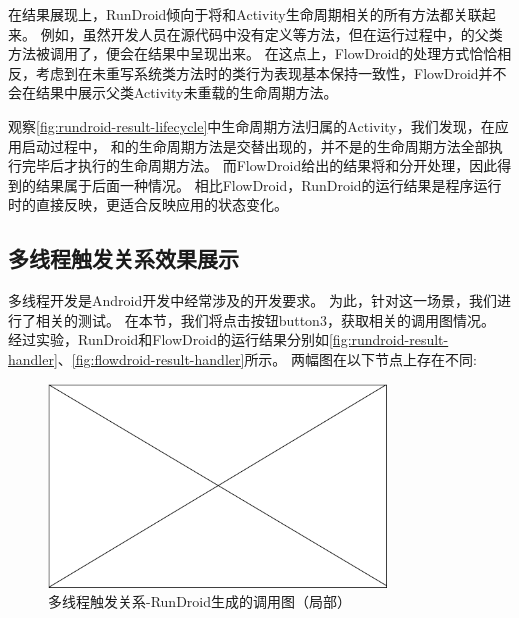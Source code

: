 在结果展现上，RunDroid倾向于将和Activity生命周期相关的所有方法都关联起来。
例如，虽然开发人员在源代码中没有定义等方法，但在运行过程中，的父类方法被调用了，便会在结果中呈现出来。
在这点上，FlowDroid的处理方式恰恰相反，考虑到在未重写系统类方法时的类行为表现基本保持一致性，FlowDroid并不会在结果中展示父类Activity未重载的生命周期方法。


{观察\autoref{fig:rundroid-result-lifecycle}中生命周期方法归属的Activity，我们发现，在应用启动过程中，
和的生命周期方法是交替出现的，并不是的生命周期方法全部执行完毕后才执行的生命周期方法。
而FlowDroid给出的结果将和分开处理，因此得到的结果属于后面一种情况。
相比FlowDroid，RunDroid的运行结果是程序运行时的直接反映，更适合反映应用的状态变化。
}

\subsection{多线程触发关系效果展示}

多线程开发是Android开发中经常涉及的开发要求。
为此，针对这一场景，我们进行了相关的测试。
在本节，我们将点击按钮button3，获取相关的调用图情况。
经过实验，RunDroid和FlowDroid的运行结果分别如\autoref{fig:rundroid-result-handler}、\autoref{fig:flowdroid-result-handler}所示。
两幅图在以下节点上存在不同:





\begin{figure}[ht]
	\centering
	\includegraphics[width=0.8\textwidth]{./Figures/empty.png}
	\caption{多线程触发关系-RunDroid生成的调用图（局部）}
	\label{fig:rundroid-result-handler}
\end{figure}




